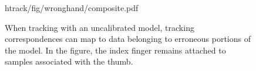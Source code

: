 \begin{figure}[b]
\centering
\begin{overpic} 
[width=\linewidth]
{htrack/fig/wronghand/composite.pdf}
\putfilename
\end{overpic}
\caption{
% 
When tracking with an uncalibrated model, tracking correspondences can map to data belonging to erroneous portions of the model. In the figure, the index finger remains attached to samples associated with the thumb. 
% 
}
\label{fig:wronghand}
\end{figure}
